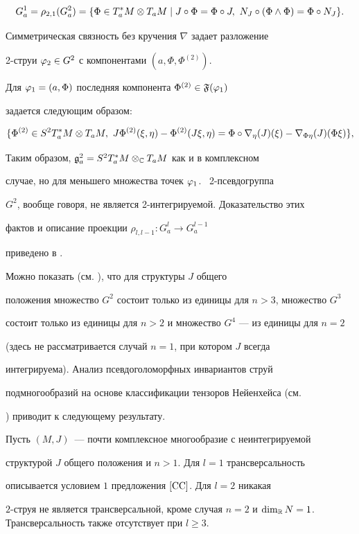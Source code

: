 $$


G^1_a=\rho_{2,1}(G^2_a)=\{\Phi\in T^*_aM\ot T_aM \mid


J\c\Phi=\Phi\c J,\ N_J\c(\Phi\we\Phi)=\Phi\c N_J \}.


$$


Симметрическая связность без кручения $\nabla$ задает разложение


2-струи $\varphi_2\in G^2$ с компонентами $(a,\Phi,\Phi^{(2)})$.


Для $\varphi_1=(a,\Phi)$ последняя компонента $\Phi^{(2)}\in{\frak F}(\varphi_1)$


задается следующим образом:


$$


\{\Phi^{(2)}\in S^2T^*_aM\ot T_aM,\


J\P^{(2)}(\x,\e)-\P^{(2)}(J\x,\e)=\P\c\nabla_\e


(J)(\x)-\nabla_{\P\e}(J)(\P\x)\},


$$


Таким образом, ${\frak g}_a^2=S^2T^*_aM\otimes_{\Bbb C} T_aM$ как и в комплексном


случае, но для меньшего множества точек $\varphi_1$. \ 2-псевдогруппа


$G^2$, вообще говоря, не является 2-интегрируемой. Доказательство этих


фактов и описание проекции $\rho_{l,l-1}:G^l_a\to G^{l-1}_a$


приведено в \cite{Kr1}.





Можно показать (см. \cite{Kr2}), что для структуры $J$ общего


положения множество $G^2$ состоит только из единицы для $n>3$, множество $G^3$


состоит только из единицы для $n>2$ и множество $G^4$ --- из единицы для $n=2$


(здесь не рассматривается случай $n=1$, при котором $J$ всегда


интегрируема). Анализ псевдоголоморфных инвариантов струй


подмногообразий на основе классификации тензоров Нейенхейса (см.


\cite{Kr2}) приводит к следующему результату.





\begin{prop}


Пусть $(M,J)$~--- почти комплексное многообразие с неинтегрируемой


структурой $J$ общего положения и $n>1$. Для $l=1$ трансверсальность


описывается условием $1$ предложения $\ref{CC}$. Для $l=2$ никакая


$2$-струя не является трансверсальной, кроме случая $n=2$ и $\dim_{\R}


N=1$. Трансверсальность также отсутствует при $l \ge 3$.


\end{prop}








